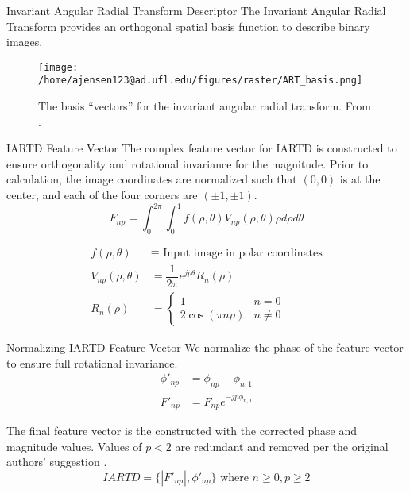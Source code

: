 \documentclass[presentation, aspectratio=1610]{beamer}
\begin{document}
\begin{frame}[label={sec:orgb1d2872}]{Invariant Angular Radial Transform Descriptor}
The Invariant Angular Radial Transform provides an orthogonal spatial basis function to describe binary images.

\begin{figure}[htbp]
\centering
\texttt{[image: /home/ajensen123@ad.ufl.edu/figures/raster/ART\_basis.png]}
\caption{The basis ``vectors'' for the invariant angular radial transform. From \autocite{leeNewShapeDescription2012}.}
\end{figure}
\end{frame}
\begin{frame}[label={sec:org32e3178}]{IARTD Feature Vector}
The complex feature vector for IARTD is constructed to ensure orthogonality and rotational invariance for the magnitude. Prior to calculation, the image coordinates are normalized such that \((0,0)\) is at the center, and each of the four corners are \((\pm 1, \pm 1)\).
\begin{equation}
  F_{np} = \int_{0}^{2\pi}\int_{0}^{1} f(\rho,\theta)V_{np}(\rho,\theta)\rho d\rho d\theta
\end{equation}


\begin{equation}
	\begin{split}
		f(\rho,\theta) & \equiv \text{ Input image in polar coordinates}  \\
		V_{np}(\rho,\theta)         & = \dfrac{1}{2\pi}e^{jp\theta}R_{n}(\rho)      \\
		R_{n}(\rho)    & =
		\begin{cases}
			1                   & n=0     \\
			2 \cos (\pi n \rho) & n \ne 0
		\end{cases}
	\end{split}
\end{equation}
\end{frame}
\begin{frame}[label={sec:orgabc4e79}]{Normalizing IARTD Feature Vector}
We normalize the phase of the feature vector to ensure full rotational invariance.
\begin{equation}
  \begin{split}
    \phi'_{np} &= \phi_{np}-\phi_{n,1} \\
    F'_{np} &= F_{np}e^{-jp\phi_{n,1}}
  \end{split}
\end{equation}

The final feature vector is the constructed with the corrected phase and magnitude values. Values of \(p<2\) are redundant and removed per the original authors' suggestion \autocite{leeNewShapeDescription2012}.
\begin{equation}
  IARTD = \{|F'_{np}|,\phi'_{np}\} \text{ where } n\ge0,p\ge2
\end{equation}
\end{frame}
\end{document}
